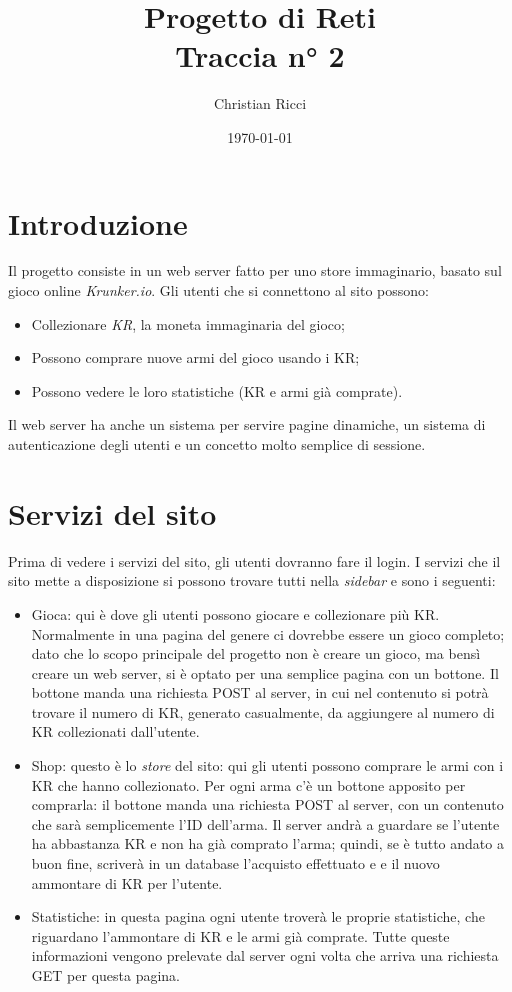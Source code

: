\documentclass[a4paper,12pt]{report}
\title{Progetto di Reti \\
\large Traccia n° 2}
\author{Christian Ricci}
\date{\today}
\begin{document}
\maketitle
\tableofcontents

\chapter{Introduzione}

Il progetto consiste in un web server fatto per uno store immaginario, basato sul gioco online \textit{Krunker.io}. Gli utenti che si connettono al sito possono: 
\begin{itemize}
\item Collezionare \textit{KR}, la moneta immaginaria del gioco;
\item Possono comprare nuove armi del gioco usando i KR;
\item Possono vedere le loro statistiche (KR e armi già comprate).
\end{itemize}

Il web server ha anche un sistema per servire pagine dinamiche, un sistema di autenticazione degli utenti e un concetto molto semplice di sessione.

\chapter{Servizi del sito}

Prima di vedere i servizi del sito, gli utenti dovranno fare il login. I servizi che il sito mette a disposizione si possono trovare tutti nella \textit{sidebar} e sono i seguenti:
\begin{itemize}
\item Gioca: qui è dove gli utenti possono giocare e collezionare più KR. Normalmente in una pagina del genere ci dovrebbe essere un gioco completo; dato che lo scopo principale del progetto non è creare un gioco, ma bensì creare un web server, si è optato per una semplice pagina con un bottone. Il bottone manda una richiesta POST al server, in cui nel contenuto si potrà trovare il numero di KR, generato casualmente, da aggiungere al numero di KR collezionati dall'utente.
\item Shop: questo è lo \textit{store} del sito: qui gli utenti possono comprare le armi con i KR che hanno collezionato. Per ogni arma c'è un bottone apposito per comprarla: il bottone manda una richiesta POST al server, con un contenuto che sarà semplicemente l'ID dell'arma. Il server andrà a guardare se l'utente ha abbastanza KR e non ha già comprato l'arma; quindi, se è tutto andato a buon fine, scriverà in un database l'acquisto effettuato e e il nuovo ammontare di KR per l'utente.
\item Statistiche: in questa pagina ogni utente troverà le proprie statistiche, che riguardano l'ammontare di KR e le armi già comprate. Tutte queste informazioni vengono prelevate dal server ogni volta che arriva una richiesta GET per questa pagina.
\end{itemize}
\end{document}
